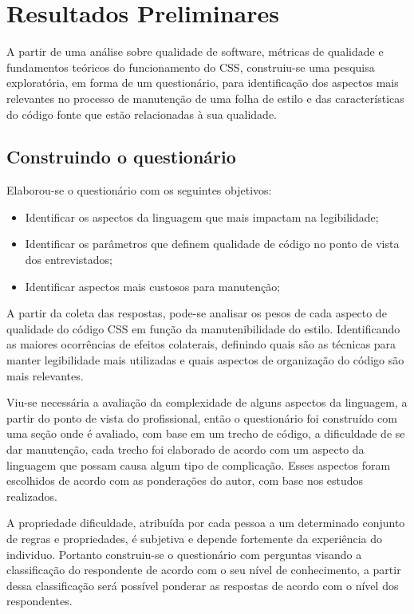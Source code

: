 %
%

\chapter{Resultados Preliminares}

A partir de uma análise sobre qualidade de software, métricas de qualidade e fundamentos teóricos do funcionamento do CSS, construiu-se uma pesquisa exploratória, em forma de um questionário, para identificação dos aspectos mais relevantes no processo de manutenção de uma folha de estilo e das características do código fonte que estão relacionadas à sua qualidade.

\section{Construindo o questionário}
Elaborou-se o questionário com os seguintes objetivos:

\begin{itemize}
	\item Identificar os aspectos da linguagem que mais impactam na legibilidade;
	\item Identificar os parâmetros que definem qualidade de código no ponto de vista dos entrevistados;
	\item Identificar aspectos mais custosos para manutenção;	
\end{itemize}

A partir da coleta das respostas, pode-se analisar os pesos de cada aspecto de qualidade do código CSS em função da manutenibilidade do estilo. Identificando as maiores ocorrências de efeitos colaterais, definindo quais são as técnicas para manter legibilidade mais utilizadas e quais aspectos de organização do código são mais relevantes.

Viu-se necessária a avaliação da complexidade de alguns aspectos da linguagem, a partir do ponto de vista do profissional, então o questionário foi construído com uma seção onde é avaliado, com base em um trecho de código, a dificuldade de se dar manutenção, cada trecho foi elaborado de acordo com um aspecto da linguagem que possam causa algum tipo de complicação. Esses aspectos foram escolhidos de acordo com as ponderações do autor, com base nos estudos realizados.

A propriedade dificuldade, atribuída por cada pessoa a um determinado conjunto de regras e propriedades, é subjetiva e depende fortemente da experiência do individuo. Portanto construiu-se o questionário com perguntas visando a classificação do respondente de acordo com o seu nível de conhecimento, a partir dessa classificação será possível ponderar as respostas de acordo com o nível dos respondentes.